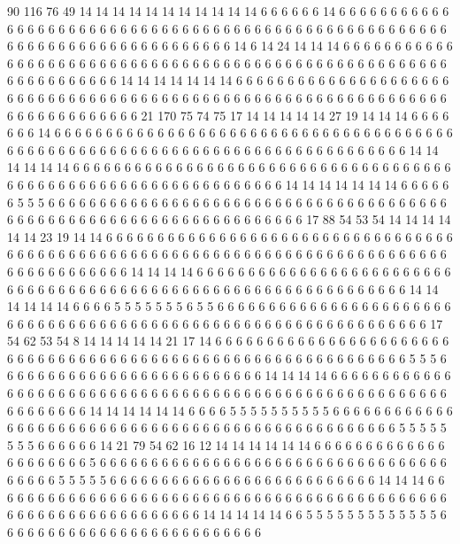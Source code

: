 90 116 76 49 14 14 14 14 14 14 14 14 14 14 14 6 6 6 6 6
6 14 6 6 6 6 6 6 6 6 6 6 6 6 6 6 6 6 6 6
6 6 6 6 6 6 6 6 6 6 6 6 6 6 6 6 6 6 6 6
6 6 6 6 6 6 6 6 6 6 6 6 6 6 6 6 6 6 6 6
6 6 6 6 6 6 6 6 6 6 6 6 6 6 6 6 6 6 14 6
14 24 14 14 14 6 6 6 6 6 6 6 6 6 6 6 6 6 6 6
6 6 6 6 6 6 6 6 6 6 6 6 6 6 6 6 6 6 6 6
6 6 6 6 6 6 6 6 6 6 6 6 6 6 6 6 6 6 6 6
6 6 6 6 6 6 6 6 6 6 14 14 14 14 14 14 14 6 6 6
6 6 6 6 6 6 6 6 6 6 6 6 6 6 6 6 6 6 6 6
6 6 6 6 6 6 6 6 6 6 6 6 6 6 6 6 6 6 6 6
6 6 6 6 6 6 6 6 6 6 6 6 6 6 6 6 6 6 6 6
6 6 6 6 6 6 6 6 6 6 6 6 6 6 21 170 75 74 75 17
14 14 14 14 14 27 19 14 14 14 6 6 6 6 6 6 6 14 6 6
6 6 6 6 6 6 6 6 6 6 6 6 6 6 6 6 6 6 6 6
6 6 6 6 6 6 6 6 6 6 6 6 6 6 6 6 6 6 6 6
6 6 6 6 6 6 6 6 6 6 6 6 6 6 6 6 6 6 6 6
6 6 6 6 6 6 6 6 6 6 6 6 6 6 6 6 14 14 14 14
14 14 6 6 6 6 6 6 6 6 6 6 6 6 6 6 6 6 6 6
6 6 6 6 6 6 6 6 6 6 6 6 6 6 6 6 6 6 6 6
6 6 6 6 6 6 6 6 6 6 6 6 6 6 6 6 6 6 6 6
6 6 6 6 6 6 14 14 14 14 14 14 14 6 6 6 6 6 6 5
5 5 6 6 6 6 6 6 6 6 6 6 6 6 6 6 6 6 6 6
6 6 6 6 6 6 6 6 6 6 6 6 6 6 6 6 6 6 6 6
6 6 6 6 6 6 6 6 6 6 6 6 6 6 6 6 6 6 6 6
6 6 6 6 6 6 6 6 6 6 17 88 54 53 54 14 14 14 14 14
14 23 19 14 14 6 6 6 6 6 6 6 6 6 6 6 6 6 6 6
6 6 6 6 6 6 6 6 6 6 6 6 6 6 6 6 6 6 6 6
6 6 6 6 6 6 6 6 6 6 6 6 6 6 6 6 6 6 6 6
6 6 6 6 6 6 6 6 6 6 6 6 6 6 6 6 6 6 6 6
6 6 6 6 6 6 6 6 6 6 6 6 6 6 14 14 14 14 6 6
6 6 6 6 6 6 6 6 6 6 6 6 6 6 6 6 6 6 6 6
6 6 6 6 6 6 6 6 6 6 6 6 6 6 6 6 6 6 6 6
6 6 6 6 6 6 6 6 6 6 6 6 6 6 6 6 6 6 6 6
6 6 14 14 14 14 14 14 6 6 6 6 5 5 5 5 5 5 5 6
5 5 6 6 6 6 6 6 6 6 6 6 6 6 6 6 6 6 6 6
6 6 6 6 6 6 6 6 6 6 6 6 6 6 6 6 6 6 6 6
6 6 6 6 6 6 6 6 6 6 6 6 6 6 6 6 6 6 6 6
6 6 6 6 6 6 17 54 62 53 54 8 14 14 14 14 14 21 17 14
6 6 6 6 6 6 6 6 6 6 6 6 6 6 6 6 6 6 6 6
6 6 6 6 6 6 6 6 6 6 6 6 6 6 6 6 6 6 6 6
6 6 6 6 6 6 6 6 6 6 6 6 6 6 6 6 6 6 6 6
6 6 5 5 5 6 6 6 6 6 6 6 6 6 6 6 6 6 6 6
6 6 6 6 6 6 6 6 6 6 6 14 14 14 14 6 6 6 6 6
6 6 6 6 6 6 6 6 6 6 6 6 6 6 6 6 6 6 6 6
6 6 6 6 6 6 6 6 6 6 6 6 6 6 6 6 6 6 6 6
6 6 6 6 6 6 6 6 6 6 6 6 6 6 6 6 6 6 14 14
14 14 14 14 6 6 6 6 5 5 5 5 5 5 5 5 5 5 6 6
6 6 6 6 6 6 6 6 6 6 6 6 6 6 6 6 6 6 6 6
6 6 6 6 6 6 6 6 6 6 6 6 6 6 6 6 6 6 6 6
6 6 6 6 6 6 6 6 5 5 5 5 5 5 5 5 6 6 6 6
6 6 14 21 79 54 62 16 12 14 14 14 14 14 14 6 6 6 6 6
6 6 6 6 6 6 6 6 6 6 6 6 6 6 6 6 5 6 6 6
6 6 6 6 6 6 6 6 6 6 6 6 6 6 6 6 6 6 6 6
6 6 6 6 6 6 6 6 6 6 6 6 6 6 6 6 5 5 5 5
5 6 6 6 6 6 6 6 6 6 6 6 6 6 6 6 6 6 6 6
6 6 6 6 6 6 6 14 14 14 6 6 6 6 6 6 6 6 6 6
6 6 6 6 6 6 6 6 6 6 6 6 6 6 6 6 6 6 6 6
6 6 6 6 6 6 6 6 6 6 6 6 6 6 6 6 6 6 6 6
6 6 6 6 6 6 6 6 6 6 6 6 6 6 14 14 14 14 14 6
6 5 5 5 5 5 5 5 5 5 5 5 5 5 6 6 6 6 6 6
6 6 6 6 6 6 6 6 6 6 6 6 6 6 6 6 6 6 6 6
